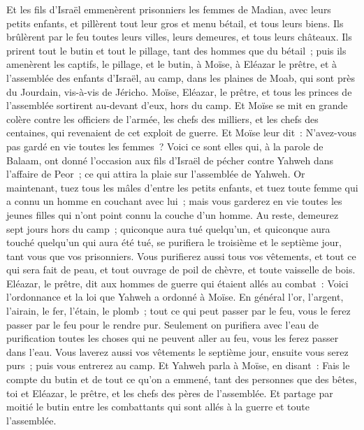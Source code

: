 \begin{multicols}{2}
Et les fils d'Israël emmenèrent prisonniers les femmes de Madian, avec leurs petits enfants, et pillèrent tout leur gros et menu bétail, et tous leurs biens.
Ils brûlèrent par le feu toutes leurs villes, leurs demeures, et tous leurs châteaux.
Ils prirent tout le butin et tout le pillage, tant des hommes que du bétail~;
puis ils amenèrent les captifs, le pillage, et le butin, à Moïse, à Eléazar le prêtre, et à l'assemblée des enfants d'Israël, au camp, dans les plaines de Moab, qui sont près du Jourdain, vis-à-vis de Jéricho.
Moïse, Eléazar, le prêtre, et tous les princes de l'assemblée sortirent au-devant d'eux, hors du camp.
Et Moïse se mit en grande colère contre les officiers de l'armée, les chefs des milliers, et les chefs des centaines, qui revenaient de cet exploit de guerre.
Et Moïse leur dit~: N'avez-vous pas gardé en vie toutes les femmes~?
Voici ce sont elles qui, à la parole de Balaam, ont donné l'occasion aux fils d'Israël de pécher contre Yahweh dans l'affaire de Peor~; ce qui attira la plaie sur l'assemblée de Yahweh.
Or maintenant, tuez tous les mâles d'entre les petits enfants, et tuez toute femme qui a connu un homme en couchant avec lui~;
mais vous garderez en vie toutes les jeunes filles qui n'ont point connu la couche d'un homme.
Au reste, demeurez sept jours hors du camp~; quiconque aura tué quelqu'un, et quiconque aura touché quelqu'un qui aura été tué, se purifiera le troisième et le septième jour, tant vous que vos prisonniers.
Vous purifierez aussi tous vos vêtements, et tout ce qui sera fait de peau, et tout ouvrage de poil de chèvre, et toute vaisselle de bois.
Eléazar, le prêtre, dit aux hommes de guerre qui étaient allés au combat~: Voici l'ordonnance et la loi que Yahweh a ordonné à Moïse.
En général l'or, l'argent, l'airain, le fer, l'étain, le plomb~;
tout ce qui peut passer par le feu, vous le ferez passer par le feu pour le rendre pur. Seulement on purifiera avec l'eau de purification toutes les choses qui ne peuvent aller au feu, vous les ferez passer dans l'eau.
Vous laverez aussi vos vêtements le septième jour, ensuite vous serez purs~; puis vous entrerez au camp.
Et Yahweh parla à Moïse, en disant~:
Fais le compte du butin et de tout ce qu'on a emmené, tant des personnes que des bêtes, toi et Eléazar, le prêtre, et les chefs des pères de l'assemblée.
Et partage par moitié le butin entre les combattants qui sont allés à la guerre et toute l'assemblée.

\end{multicols}
